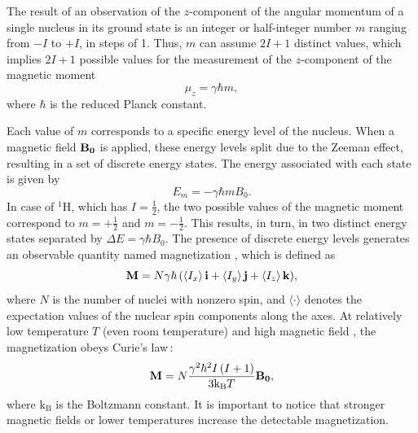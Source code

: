 The result of an observation of the $z$-component of the angular momentum  of a single nucleus in its ground state is an integer or half-integer number $m$ ranging from $-I$ to $+I$, in steps of \num{1}. Thus, $m$ can assume $2I + 1$ distinct values, which implies $2I + 1$ possible values for the measurement of the $z$-component of the magnetic moment
\begin{equation}
    \mu_z = \gamma \hbar m,
\end{equation}
where $\hbar$ is the reduced Planck constant.

Each value of $m$ corresponds to a specific energy level of the nucleus. When a magnetic field $\mathbf{B_0}$ is applied, these energy levels split due to the Zeeman effect, resulting in a set of discrete energy states. The energy associated with each state is given by
\begin{equation}
    E_m = -\gamma \hbar m B_0.
\end{equation}
In case of $^1$H, which has $I = \frac{1}{2}$, the two possible values of the magnetic moment correspond to $m = +\frac{1}{2}$ and $m = -\frac{1}{2}$. This results, in turn, in two distinct energy states separated by $\Delta E = \gamma \hbar B_0$. The presence of discrete energy levels generates an observable quantity named magnetization , which is defined as
\begin{equation}
    \mathbf{M} = N \gamma \hbar\,(\langle I_x \rangle \,\mathbf{i} + \langle I_y \rangle\,\mathbf{j} + \langle I_z \rangle\,\mathbf{k}),
\end{equation}
where $N$ is the number of nuclei with nonzero spin, and $\langle \cdot \rangle$ denotes the expectation values of the nuclear spin components along the axes. At relatively low temperature $T$ (even room temperature) and high magnetic field , the magnetization obeys Curie's law\,\cite{curie_law}:
\begin{equation}
    \mathbf{M} = N\frac{\gamma^2 \hbar^2 I\,(I+1)}{3\mathrm{k}_\mathrm{B} T} \mathbf{B_0},
\end{equation}
where $\mathrm{k}_\mathrm{B}$ is the Boltzmann constant. It is important to notice that stronger magnetic fields or lower temperatures increase the detectable magnetization.


